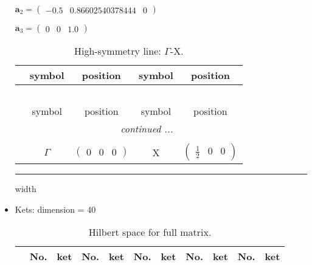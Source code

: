 \documentclass[fleqn,10pt,landscape]{article}
\begin{document}
\begin{itemize}
\quad $\bm{a}_2=\begin{pmatrix} -0.5 & 0.86602540378444 & 0 \end{pmatrix}$

\quad $\bm{a}_3=\begin{pmatrix} 0 & 0 & 1.0 \end{pmatrix}$

\begin{center}
\renewcommand{\arraystretch}{1.3}
\begin{longtable}{c|cc|cc}
\caption{High-symmetry line: $\Gamma$-X.}
 \\
 \hline \hline
 & symbol & position & symbol & position \\ \hline \endfirsthead

\multicolumn{4}{l}{\tablename\ \thetable{}} \\
 \hline \hline
 & symbol & position & symbol & position \\ \hline \endhead

 \hline \hline
\multicolumn{4}{r}{\footnotesize\it continued ...} \\ \endfoot

 \hline \hline
\multicolumn{4}{r}{} \\ \endlastfoot

 & $\Gamma$ & $\begin{pmatrix} 0 & 0 & 0 \end{pmatrix}$ & X & $\begin{pmatrix} \frac{1}{2} & 0 & 0 \end{pmatrix}$ \\
\end{longtable}
\end{center}

 \hfil \hrule height 1mm width \textwidth \hfil

\item Kets: dimension = 40
\begin{center}
\renewcommand{\arraystretch}{1.3}
\begin{longtable}{c|cc|cc|cc|cc|cc}
\caption{Hilbert space for full matrix.}
 \\
 \hline \hline
 & No. & ket & No. & ket & No. & ket & No. & ket & No. & ket \\ \hline \endfirsthead


\end{longtable}
\end{center}
\end{itemize}
\end{document}
